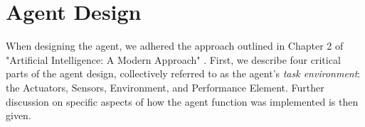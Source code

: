 




\section{Agent Design}\label{section:intial_agent_design}

When designing the agent, we adhered the approach outlined in Chapter 2 of "Artificial Intelligence: A Modern Approach" \cite{AIAMA}. First, we describe four critical parts of the agent design, collectively referred to as the agent's \textit{task environment}: the Actuators, Sensors, Environment, and Performance Element. Further discussion on specific aspects of how the agent function was implemented is then given.















